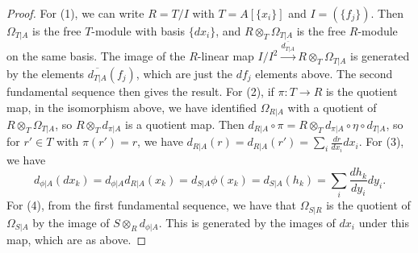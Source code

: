 \documentclass{amsart}[12pt]
\numberwithin{equation}{section}
\theoremstyle{plain} %
\theoremstyle{definition}
\theoremstyle{remark}
\newcommand{\xra}[1]{\xrightarrow{#1}}
\begin{document}
\begin{proof}
For (1),
we can write $R=T/I$ with $T=A[\{x_i\}]$ and  $I=(\{f_j\})$. Then $\Omega_{T|A}$ is the free $T$-module with basis $\{dx_i\}$, and $R \otimes_T \Omega_{T|A}$ is the free $R$-module on the same basis. The image of the $R$-linear map $I/I^2 \xra{\overline{d_{T|A}} } R \otimes_T \Omega_{T|A}$ is generated by the elements $\overline{d_{T|A}}(f_j)$, which are just the $df_j$ elements above. The second fundamental sequence then gives the result.
For (2), if $\pi:T\to R$ is the quotient map, in the isomorphism above, we have identified $\Omega_{R|A}$ with a quotient of $R\otimes_T \Omega_{T|A}$, so $R\otimes_T d_{\pi|A}$ is a quotient map. Then $d_{R|A} \circ \pi = R\otimes_T {d_{\pi|A} }\circ \eta \circ d_{T|A}$, so for $r'\in T$ with $\pi(r')=r$, we have $d_{R|A}(r)=d_{R|A}(r')=\sum_i \frac{dr}{dx_i} dx_i$. 
For (3), we  have \[d_{\phi|A}(dx_k)=d_{\phi|A} d_{R|A} (x_k) = d_{S|A} \phi(x_k) = d_{S|A}(h_k) = \sum_i \frac{dh_k}{dy_i} dy_i.\]
For (4), from the first fundamental sequence, we have that $\Omega_{S|R}$ is the quotient of $\Omega_{S|A}$ by the image of $S\otimes_R d_{\phi|A}$. This is generated by the images of $dx_i$ under this map, which are as above.
\end{proof}
\end{document}
